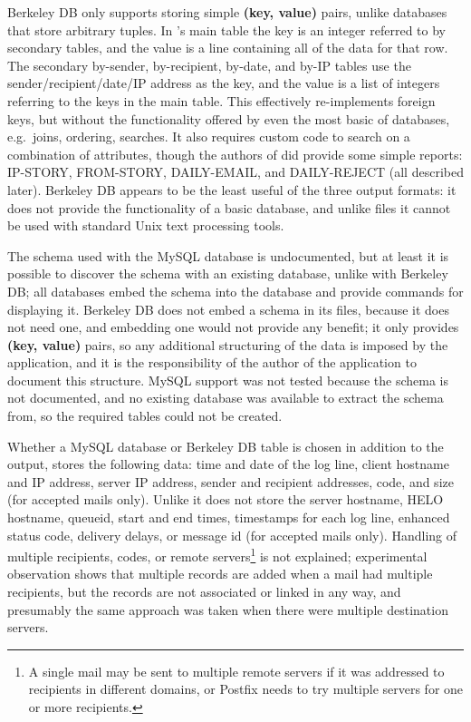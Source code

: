 Berkeley DB only supports storing simple \textbf{(key, value)} pairs,
unlike  databases that store arbitrary tuples.  In
's main table the key is an integer referred to by secondary
tables, and the value is a  line containing all of the data
for that row.  The secondary by-sender, by-recipient, by-date, and by-IP
tables use the sender/recipient/date/IP address as the key, and the value
is a  list of integers referring to the keys in the main
table.  This effectively re-implements  foreign keys, but
without the functionality offered by even the most basic of 
databases, e.g.\ joins, ordering, searches.  It also requires custom code
to search on a combination of attributes, though the authors of
 did provide some simple reports: IP-STORY, FROM-STORY,
DAILY-EMAIL, and DAILY-REJECT (all described later).  Berkeley DB appears
to be the least useful of the three output formats: it does not provide the
functionality of a basic  database, and unlike 
files it cannot be used with standard Unix text processing tools.

The schema used with the MySQL database is undocumented, but at least it is
possible to discover the schema with an existing  database,
unlike with Berkeley DB\@; all  databases embed the schema
into the database and provide commands for displaying it.  Berkeley DB does
not embed a schema in its files, because it does not need one, and
embedding one would not provide any benefit; it only provides \textbf{(key,
value)} pairs, so any additional structuring of the data is imposed by the
application, and it is the responsibility of the author of the application
to document this structure.  MySQL support was not tested because the
schema is not documented, and no existing database was available to extract
the schema from, so the required tables could not be created.

Whether a MySQL database or Berkeley DB table is chosen in addition to the
 output,  stores the following data: time and
date of the log line, client hostname and IP address, server IP address,
sender and recipient addresses,  code, and size (for accepted
mails only).  Unlike \parsername{} it does not store the server hostname,
HELO hostname, queueid, start and end times, timestamps for each log line,
enhanced status code, delivery delays, or message id (for accepted mails
only).  Handling of multiple recipients,  codes, or remote
servers\footnote{A single mail may be sent to multiple remote servers if it
was addressed to recipients in different domains, or Postfix needs to try
multiple servers for one or more recipients.} is not explained;
experimental observation shows that multiple records are added when a mail
had multiple recipients, but the records are not associated or linked in
any way, and presumably the same approach was taken when there were
multiple destination servers.

